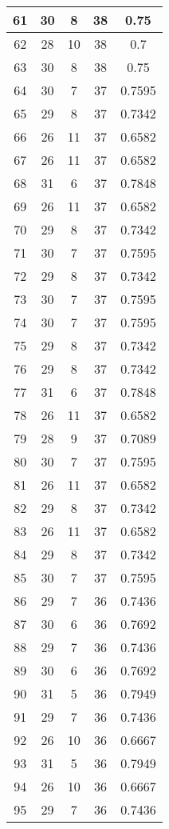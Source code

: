 \documentclass[letterpaper, 12pt]{article}
\begin{document}
\begin{longtable}{|c|c|c|c|c|}
61 & 30 & 8 & 38 & 0.75 \\
\hline
62 & 28 & 10 & 38 & 0.7 \\
\hline
63 & 30 & 8 & 38 & 0.75 \\
\hline
64 & 30 & 7 & 37 & 0.7595 \\
\hline
65 & 29 & 8 & 37 & 0.7342 \\
\hline
66 & 26 & 11 & 37 & 0.6582 \\
\hline
67 & 26 & 11 & 37 & 0.6582 \\
\hline
68 & 31 & 6 & 37 & 0.7848 \\
\hline
69 & 26 & 11 & 37 & 0.6582 \\
\hline
70 & 29 & 8 & 37 & 0.7342 \\
\hline
71 & 30 & 7 & 37 & 0.7595 \\
\hline
72 & 29 & 8 & 37 & 0.7342 \\
\hline
73 & 30 & 7 & 37 & 0.7595 \\
\hline
74 & 30 & 7 & 37 & 0.7595 \\
\hline
75 & 29 & 8 & 37 & 0.7342 \\
\hline
76 & 29 & 8 & 37 & 0.7342 \\
\hline
77 & 31 & 6 & 37 & 0.7848 \\
\hline
78 & 26 & 11 & 37 & 0.6582 \\
\hline
79 & 28 & 9 & 37 & 0.7089 \\
\hline
80 & 30 & 7 & 37 & 0.7595 \\
\hline
81 & 26 & 11 & 37 & 0.6582 \\
\hline
82 & 29 & 8 & 37 & 0.7342 \\
\hline
83 & 26 & 11 & 37 & 0.6582 \\
\hline
84 & 29 & 8 & 37 & 0.7342 \\
\hline
85 & 30 & 7 & 37 & 0.7595 \\
\hline
86 & 29 & 7 & 36 & 0.7436 \\
\hline
87 & 30 & 6 & 36 & 0.7692 \\
\hline
88 & 29 & 7 & 36 & 0.7436 \\
\hline
89 & 30 & 6 & 36 & 0.7692 \\
\hline
90 & 31 & 5 & 36 & 0.7949 \\
\hline
91 & 29 & 7 & 36 & 0.7436 \\
\hline
92 & 26 & 10 & 36 & 0.6667 \\
\hline
93 & 31 & 5 & 36 & 0.7949 \\
\hline
94 & 26 & 10 & 36 & 0.6667 \\
\hline
95 & 29 & 7 & 36 & 0.7436 \\

\end{longtable}
\end{document}
